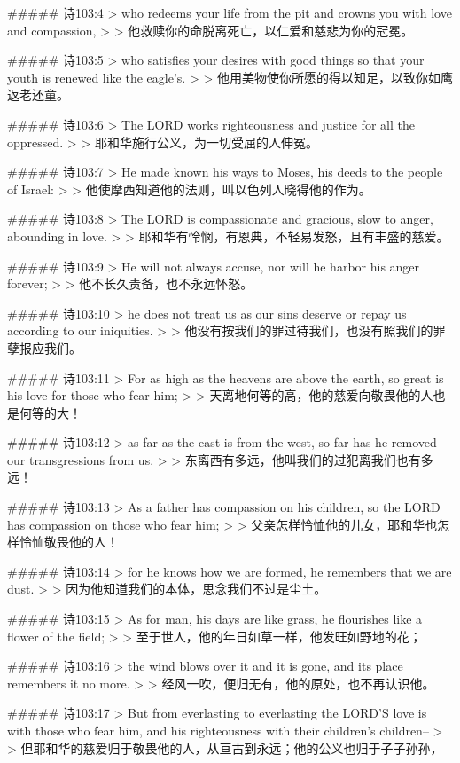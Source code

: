 ##### 诗103:4
> who redeems your life from the pit and crowns you with love and compassion,
>
> 他救赎你的命脱离死亡，以仁爱和慈悲为你的冠冕。


##### 诗103:5
> who satisfies your desires with good things so that your youth is renewed like the eagle's.
>
> 他用美物使你所愿的得以知足，以致你如鹰返老还童。


##### 诗103:6
> The LORD works righteousness and justice for all the oppressed.
>
> 耶和华施行公义，为一切受屈的人伸冤。


##### 诗103:7
> He made known his ways to Moses, his deeds to the people of Israel:
>
> 他使摩西知道他的法则，叫以色列人晓得他的作为。


##### 诗103:8
> The LORD is compassionate and gracious, slow to anger, abounding in love.
>
> 耶和华有怜悯，有恩典，不轻易发怒，且有丰盛的慈爱。


##### 诗103:9
> He will not always accuse, nor will he harbor his anger forever;
>
> 他不长久责备，也不永远怀怒。


##### 诗103:10
> he does not treat us as our sins deserve or repay us according to our iniquities.
>
> 他没有按我们的罪过待我们，也没有照我们的罪孽报应我们。


##### 诗103:11
> For as high as the heavens are above the earth, so great is his love for those who fear him;
>
> 天离地何等的高，他的慈爱向敬畏他的人也是何等的大！


##### 诗103:12
> as far as the east is from the west, so far has he removed our transgressions from us.
>
> 东离西有多远，他叫我们的过犯离我们也有多远！


##### 诗103:13
> As a father has compassion on his children, so the LORD has compassion on those who fear him;
>
> 父亲怎样怜恤他的儿女，耶和华也怎样怜恤敬畏他的人！


##### 诗103:14
> for he knows how we are formed, he remembers that we are dust.
>
> 因为他知道我们的本体，思念我们不过是尘土。


##### 诗103:15
> As for man, his days are like grass, he flourishes like a flower of the field;
>
> 至于世人，他的年日如草一样，他发旺如野地的花；


##### 诗103:16
> the wind blows over it and it is gone, and its place remembers it no more.
>
> 经风一吹，便归无有，他的原处，也不再认识他。


##### 诗103:17
> But from everlasting to everlasting the LORD'S love is with those who fear him, and his righteousness with their children's children--
>
> 但耶和华的慈爱归于敬畏他的人，从亘古到永远；他的公义也归于子子孙孙，



